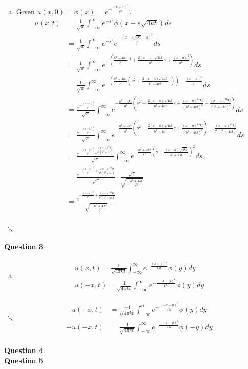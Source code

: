 \documentclass[12pt, letterpaper]{article}
\begin{document}
\begin{enumerate}[(a)]
    \item Given $u(x,0) = \phi(x) = e^{-\frac{(x-a)^2}{b^2}}$. \\
    \begin{align*}
        u(x,t) &= \frac{1}{\sqrt \pi} \int_{-\infty}^{\infty} e^{-s^2}\phi(x-s\sqrt{4kt})ds \\
        &= \frac{1}{\sqrt \pi} \int_{-\infty}^{\infty}e^{-s^2}e^{-\frac{(x-s\sqrt{4kt}-a)^2}{b^2}} ds \\
        &= \frac{1}{\sqrt \pi} \int_{-\infty}^{\infty}e^{-\left(\frac{b^2+4kt}{b^2}s^2+\frac{2(x-a)\sqrt{4kt}}{b^2}s+\frac{(x-a)^2}{b^2}\right)} ds \\
        &= \frac{1}{\sqrt \pi} \int_{-\infty}^{\infty}e^{-\left(\frac{b^2+4kt}{b^2}\left(s^2+\frac{2(x-a)\sqrt{4kt}}{b^2+4kt}s\right)\right)-\frac{(x-a)^2}{b^2}} ds \\
        &= \frac{e^{-\frac{(x-a)^2}{b^2}}}{\sqrt\pi}\int_{-\infty}^{\infty}e^{-\frac{b^2+4kt}{b^2}\left(s^2+\frac{2(x-a)\sqrt{4kt}}{b^2+4kt}s+\frac{(x-a)^24kt}{(b^2+4kt)^2}-\frac{(x-a)^24kt}{(b^2+4kt)^2}\right)} ds \\
        &= \frac{e^{-\frac{(x-a)^2}{b^2}}}{\sqrt\pi}\int_{-\infty}^{\infty}e^{-\frac{b^2+4kt}{b^2}\left(s^2+\frac{2(x-a)\sqrt{4kt}}{b^2+4kt}s+\frac{(x-a)^24kt}{(b^2+4kt)^2}\right)+\frac{(x-a)^24kt}{b^2(b^2+4kt)}} ds \\
        &= \frac{e^{-\frac{(x-a)^2}{b^2}}e^{\frac{(x-a)^24kt}{b^2(b^2+4kt)}}}{\sqrt\pi}\int_{-\infty}^{\infty}e^{-\frac{b^2+4kt}{b^2}\left(s+\frac{(x-a)\sqrt{4kt}}{b^2+4kt}\right)^2}ds \\
        &= \frac{e^{-\frac{(x-a)^2}{b^2}+\frac{(x-a)^24kt}{b^2(b^2+4kt)}}}{\sqrt\pi} \cdot \frac{\sqrt{\pi}}{\sqrt{-\frac{b^2+4kt}{b^2}}} \\
        &= \frac{e^{-\frac{(x-a)^2}{b^2}+\frac{(x-a)^24kt}{b^2(b^2+4kt)}}}{\sqrt{-\frac{b^2+4kt}{b^2}}} \\
    \end{align*}
    \item 
\end{enumerate}
\newpage
\noindent \textbf{Question 3}
\begin{enumerate}[(a)]
    \item 
    \begin{align*}
        u(x,t) =\frac{1}{\sqrt{4\pi kt}}\int_{-\infty}^{\infty} e^{-\frac{(x-y)^2}{4kt}}\phi(y)dy \\
        u(-x,t)=\frac{1}{\sqrt{4\pi kt}}\int_{-\infty}^{\infty} e^{-\frac{(-x-y)^2}{4kt}}\phi(y)dy 
    \end{align*}
    \item 
    \begin{align*}
        -u(-x,t)&=\frac{-1}{\sqrt{4\pi kt}}\int_{-\infty}^{\infty} e^{-\frac{(-x-y)^2}{4kt}}\phi(y)dy \\
        -u(-x,t)&=\frac{1}{\sqrt{4\pi kt}}\int_{-\infty}^{\infty} e^{-\frac{(-x-y)^2}{4kt}}\phi(-y)dy \\
    \end{align*}
\end{enumerate}
\noindent \textbf{Question 4} \\
\noindent \textbf{Question 5} \\
\end{document}
